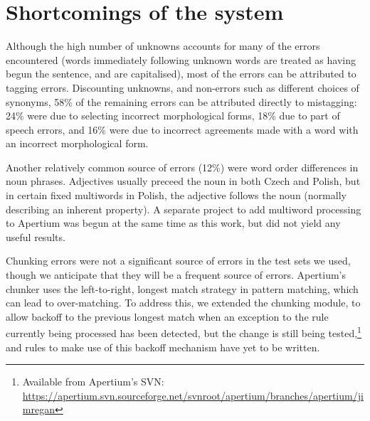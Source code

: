 \documentclass[11pt]{article}
\begin{document}
\section{Shortcomings of the system}

Although the high number of unknowns accounts for %
many
of the errors encountered (words immediately following unknown words are treated
as having begun the sentence, and are capitalised),
most of the errors can be attributed to tagging errors. 
Discounting unknowns, and non-errors such as different choices of synonyms,
58\% of the remaining errors can be attributed directly to mistagging: 24\% 
were due to selecting incorrect morphological forms, 18\% due to part of speech
errors, and 16\% were due to incorrect agreements made with a word with an incorrect
morphological form.


Another relatively common source of errors (12\%) were word order differences in noun phrases.
Adjectives usually preceed the noun in both Czech and Polish, but in certain fixed 
multiwords in Polish, the adjective follows the noun (normally describing an 
inherent property). A separate project to add
multiword processing to Apertium was begun at the same time as this work, but
did not yield any useful results. 

Chunking errors were not a significant source of errors in the test sets we used,
though we anticipate that they will be a frequent source of errors. Apertium's
chunker uses the left-to-right, longest match strategy in pattern matching,
which can lead to over-matching. To address this, we extended the chunking 
module, to allow backoff to the previous longest match when an exception
to the rule currently being processed has been detected, but the change is
still being tested,\footnote{Available from Apertium's SVN:
\url{https://apertium.svn.sourceforge.net/svnroot/apertium/branches/apertium/jimregan}
} and rules to make use of this backoff mechanism have
yet to be written. 
\end{document}
